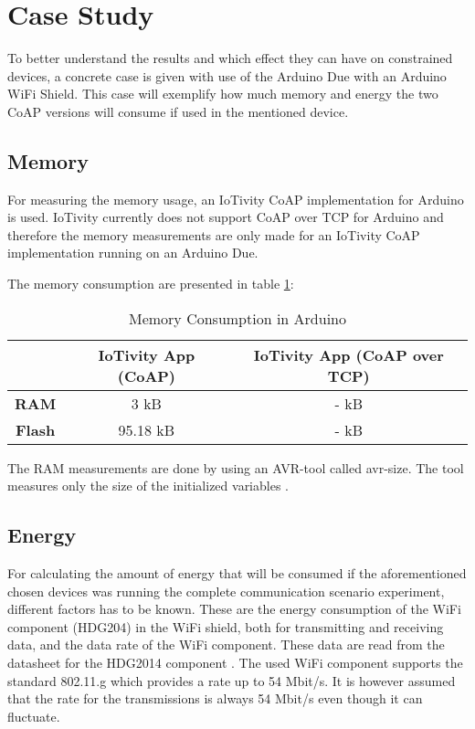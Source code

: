\section{Case Study} \label{sec:casestudy}
To better understand the results and which effect they can have on constrained devices, a concrete case is given with use of the Arduino Due with an Arduino WiFi Shield. This case will exemplify how much memory and energy the two CoAP versions will consume if used in the mentioned device.

\subsection{Memory}
For measuring the memory usage, an IoTivity CoAP implementation for Arduino is used. IoTivity currently does not support CoAP over TCP for Arduino and therefore the memory measurements are only made for an IoTivity CoAP implementation running on an Arduino Due.
 
The memory consumption are presented in table \ref{tab:memory}:
\begin{table}[bht]
	\renewcommand{\arraystretch}{1.3}
	\caption{Memory Consumption in Arduino}
	\label{tab:memory}
	\centering
	\begin{tabular}{|c|c|c|}
		\hline
		\bfseries  & \bfseries IoTivity App (CoAP) & \bfseries IoTivity App (CoAP over TCP) \\
		\hline
		\textbf{RAM} & 3 kB & - kB \\
		\hline
		\textbf{Flash} & 95.18 kB & - kB \\
		\hline
	\end{tabular}
\end{table}

The RAM measurements are done by using an AVR-tool called avr-size. The tool measures only the size of the initialized variables \cite{Check55:online}.

\subsection{Energy}
For calculating the amount of energy that will be consumed if the aforementioned chosen devices was running the complete communication scenario experiment, different factors has to be known. These are the energy consumption of the WiFi component (HDG204) in the WiFi shield, both for transmitting and receiving data, and the data rate of the WiFi component. These data are read from the datasheet for the HDG2014 component \cite{hdg204:datasheet}. The used WiFi component supports the standard 802.11.g which provides a rate up to 54 Mbit/s. It is however assumed that the rate for the transmissions is always 54 Mbit/s even though it can fluctuate. 

